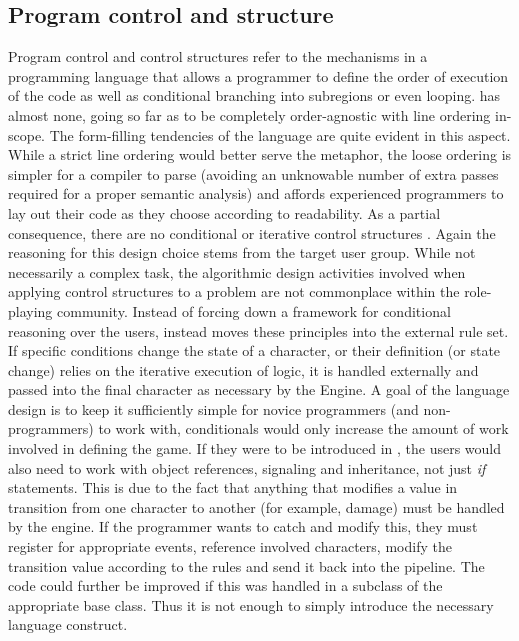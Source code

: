 \subsection{Program control and structure}
Program control and control structures refer to the mechanisms in a programming language that allows a programmer to define the order of execution of the code as well as conditional branching into subregions or even looping. \langname{} has almost none, going so far as to be completely order-agnostic with line ordering in-scope. 
The form-filling tendencies of the language are quite evident in this aspect. While a strict line ordering would better serve the metaphor, the loose ordering is simpler for a compiler to parse (avoiding an unknowable number of extra passes required for a proper semantic analysis) and affords experienced programmers to lay out their code as they choose according to readability. As a partial consequence, there are no conditional or iterative control structures .
Again the reasoning for this design choice stems from the target user group. While not necessarily a complex task, the algorithmic design activities involved when applying control structures to a problem are not commonplace within the role-playing community. Instead of forcing down a framework for conditional reasoning over the users, \langname{} instead moves these principles into the external rule set.
If specific conditions change the state of a character, or their definition (or state change) relies on the iterative execution of logic, it is handled externally and passed into the final character as necessary by the Engine.
A goal of the language design is to keep it sufficiently simple for novice programmers (and non-programmers) to work with, conditionals would only increase the amount of work involved in defining the game. If they were to be introduced in \langname{}, the users would also need to work with object references, signaling and inheritance, not just \emph{if} statements.
This is due to the fact that anything that modifies a value in transition from one character to another (for example, damage) must be handled by the engine. If the programmer wants to catch and modify this, they must register for appropriate events, reference involved characters, modify the transition value according to the rules and send it back into the pipeline. The code could further be improved if this was handled in a subclass of the appropriate \langname{} base class. Thus it is not enough to simply introduce the necessary language construct.
